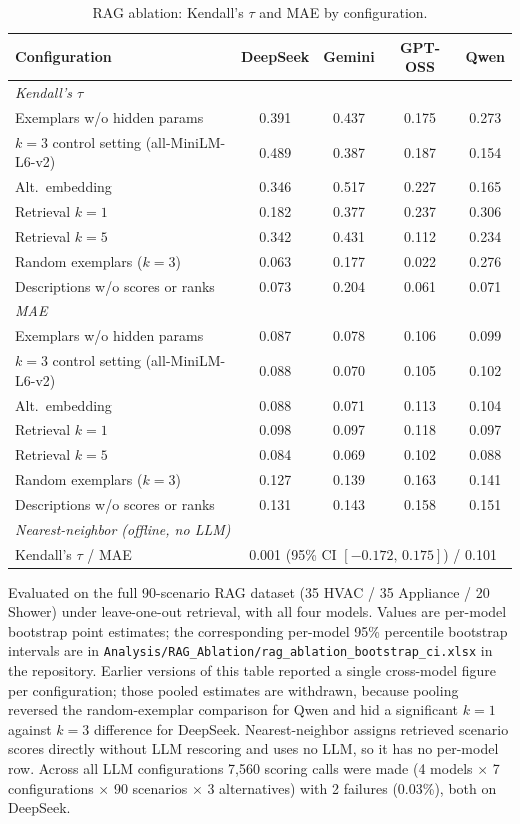 \documentclass[11pt]{article}
\begin{document}
\begin{table}[htbp]
\centering
\small
\centering
\caption{RAG ablation: Kendall's $\tau$ and MAE by configuration.}
\label{tab:rag_ablation_full}
\renewcommand{\arraystretch}{1.15}
\begin{tabular}{lcccc}
\toprule
Configuration & DeepSeek & Gemini & GPT-OSS & Qwen \\
\midrule
\multicolumn{5}{l}{\emph{Kendall's $\tau$}} \\
Exemplars w/o hidden params & 0.391 & 0.437 & 0.175 & 0.273 \\
$k{=}3$ control setting (all-MiniLM-L6-v2) & 0.489 & 0.387 & 0.187 & 0.154 \\
Alt.\ embedding & 0.346 & 0.517 & 0.227 & 0.165 \\
Retrieval $k=1$ & 0.182 & 0.377 & 0.237 & 0.306 \\
Retrieval $k=5$ & 0.342 & 0.431 & 0.112 & 0.234 \\
Random exemplars ($k=3$) & 0.063 & 0.177 & 0.022 & 0.276 \\
Descriptions w/o scores or ranks & 0.073 & 0.204 & 0.061 & 0.071 \\
\midrule
\multicolumn{5}{l}{\emph{MAE}} \\
Exemplars w/o hidden params & 0.087 & 0.078 & 0.106 & 0.099 \\
$k{=}3$ control setting (all-MiniLM-L6-v2) & 0.088 & 0.070 & 0.105 & 0.102 \\
Alt.\ embedding & 0.088 & 0.071 & 0.113 & 0.104 \\
Retrieval $k=1$ & 0.098 & 0.097 & 0.118 & 0.097 \\
Retrieval $k=5$ & 0.084 & 0.069 & 0.102 & 0.088 \\
Random exemplars ($k=3$) & 0.127 & 0.139 & 0.163 & 0.141 \\
Descriptions w/o scores or ranks & 0.131 & 0.143 & 0.158 & 0.151 \\
\midrule
\multicolumn{5}{l}{\emph{Nearest-neighbor (offline, no LLM)}} \\
Kendall's $\tau$ / MAE & \multicolumn{4}{c}{0.001 (95\% CI $[-0.172,\, 0.175]$) / 0.101} \\
\bottomrule
\end{tabular}
\renewcommand{\arraystretch}{1.0}
\end{table}

Evaluated on the full 90-scenario RAG dataset (35 HVAC / 35 Appliance / 20 Shower) under leave-one-out retrieval, with all four models. Values are per-model bootstrap point estimates; the corresponding per-model 95\% percentile bootstrap intervals are in \texttt{Analysis/RAG\_Ablation/rag\_ablation\_bootstrap\_ci.xlsx} in the repository. Earlier versions of this table reported a single cross-model figure per configuration; those pooled estimates are withdrawn, because pooling reversed the random-exemplar comparison for Qwen and hid a significant $k{=}1$ against $k{=}3$ difference for DeepSeek. Nearest-neighbor assigns retrieved scenario scores directly without LLM rescoring and uses no LLM, so it has no per-model row. Across all LLM configurations 7,560 scoring calls were made (4 models $\times$ 7 configurations $\times$ 90 scenarios $\times$ 3 alternatives) with 2 failures (0.03\%), both on DeepSeek.
\end{document}
